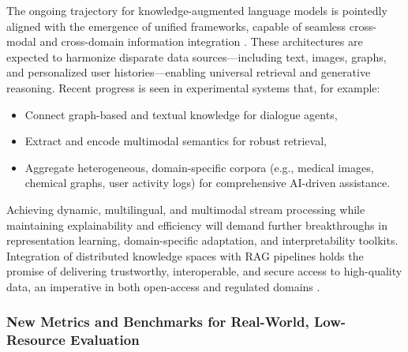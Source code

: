 \documentclass[sigconf]{acmart}
\begin{document}
The ongoing trajectory for knowledge-augmented language models is pointedly aligned with the emergence of unified frameworks, capable of seamless cross-modal and cross-domain information integration \cite{ref61,ref62,ref63,ref64}. These architectures are expected to harmonize disparate data sources—including text, images, graphs, and personalized user histories—enabling universal retrieval and generative reasoning. Recent progress is seen in experimental systems that, for example:
\begin{itemize}
    \item Connect graph-based and textual knowledge for dialogue agents,
    \item Extract and encode multimodal semantics for robust retrieval,
    \item Aggregate heterogeneous, domain-specific corpora (e.g., medical images, chemical graphs, user activity logs) for comprehensive AI-driven assistance.
\end{itemize}
\cite{ref5,ref14,ref23,ref29,ref36,ref43,ref54}

Achieving dynamic, multilingual, and multimodal stream processing while maintaining explainability and efficiency will demand further breakthroughs in representation learning, domain-specific adaptation, and interpretability toolkits. Integration of distributed knowledge spaces with RAG pipelines holds the promise of delivering trustworthy, interoperable, and secure access to high-quality data, an imperative in both open-access and regulated domains \cite{ref62}.

\subsubsection{New Metrics and Benchmarks for Real-World, Low-Resource Evaluation}
\end{document}
